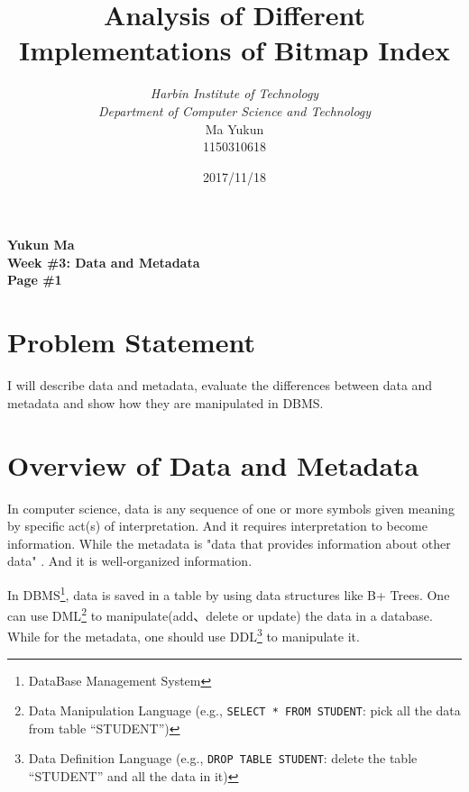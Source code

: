 \documentclass[12pt, a4paper]{article}
\begin{document}
\title{{\bf\Huge Analysis of Different Implementations of Bitmap Index}}
\author{\emph{Harbin Institute of Technology}\\\emph{Department of Computer Science and Technology}\\Ma Yukun\\1150310618}

\date{2017/11/18}

\nocite{*}


\begin{center}
{\textbf{
Yukun Ma\\
Week \#3: Data and Metadata\\
Page \#1}}
\end{center}

\section{Problem Statement}

I will describe data and metadata, evaluate the differences between data and metadata and show how they are manipulated in DBMS.





\section{Overview of Data and Metadata}

In computer science, data is any sequence of one or more symbols given meaning by specific act(s) of interpretation. And it requires interpretation to become information. \cite{data_wiki} While the metadata is "data that provides information about other data" \cite{metadata_wiki}. And it is well-organized information.

In DBMS\footnote{DataBase Management System}, data is saved in a table by using data structures like B+ Trees. One can use DML\footnote{Data Manipulation Language (e.g., \texttt{SELECT * FROM STUDENT}: pick all the data from table ``STUDENT'')} to manipulate(add、delete or update) the data in a database. While for the metadata, one should use DDL\footnote{Data Definition Language (e.g., \texttt{DROP TABLE STUDENT}: delete the table ``STUDENT'' and all the data in it)} to manipulate it.
\end{document}
